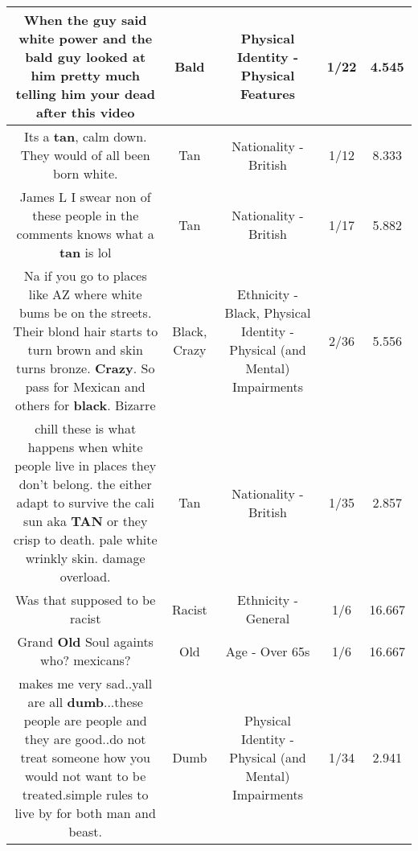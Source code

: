 \documentclass[11pt]{article}
\newlength\mylength
\begin{document}
\begin{center}
\begin{longtable}{|C{.65\mylength}|C{.30\mylength}|C{.12\mylength}|C{.12\mylength}|C{.12\mylength}|}
  \small When the guy said white power and the \textbf{bald} guy looked at him pretty much telling him your dead after this video\normalsize   & Bald & Physical Identity - Physical Features & 1/22 & 4.545 \\  \hline
  \small Its a \textbf{tan}, calm down. They would of all been born white.\normalsize   & Tan & Nationality - British & 1/12 & 8.333 \\  \hline
  \small James L  I swear non of these people in the comments knows what a \textbf{tan} is lol\normalsize   & Tan & Nationality - British & 1/17 & 5.882 \\  \hline
  \small Na if you go to places like AZ where white bums be on the streets. Their blond hair starts to turn brown and skin turns bronze. \textbf{Crazy}. So pass for Mexican and others for \textbf{black}. Bizarre\normalsize   & Black, Crazy & Ethnicity - Black, Physical Identity - Physical (and Mental) Impairments & 2/36 & 5.556 \\  \hline
  \small chill  these is what happens when white people live in places they don't belong. the either adapt to survive the cali sun aka \textbf{TAN} or they crisp to death. pale white wrinkly skin. damage overload.\normalsize   & Tan & Nationality - British & 1/35 & 2.857 \\  \hline
  \small Was that supposed to be racist\normalsize   & Racist & Ethnicity - General & 1/6 & 16.667 \\  \hline
  \small Grand \textbf{Old} Soul againts who? mexicans?\normalsize   & Old & Age - Over 65s & 1/6 & 16.667 \\  \hline
  \small makes me very sad..yall are all \textbf{dumb}...these people are people and they are good..do not treat someone how you would not want to be treated.simple rules to live by for both man and beast.\normalsize   & Dumb & Physical Identity - Physical (and Mental) Impairments & 1/34 & 2.941 \\  \hline

\end{longtable}
\end{center}
\end{document}
